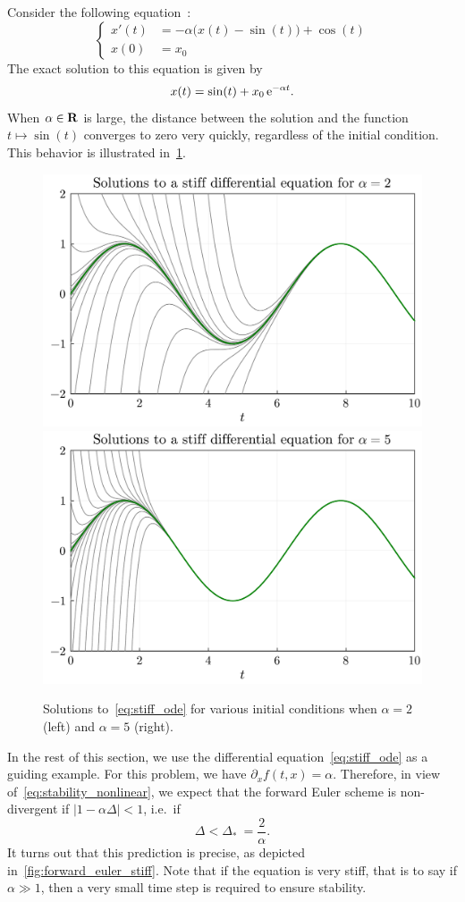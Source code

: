\begin{example}
    \label{example:stiff_ode}
    Consider the following equation~\cite[Chapter 4]{Legat}:
    \begin{equation}
        \label{eq:stiff_ode}
        \left\{
        \begin{aligned}
            x'(t) &= - \alpha \bigl(x(t) - \sin(t) \bigr) + \cos(t) \\
            x(0) &= x_0
        \end{aligned}
        \right.
    \end{equation}
    The exact solution to this equation is given by
    \[
        x(t) = \sin(t) + x_0 \, \mathrm e^{-\alpha t}.
    \]
    When $\alpha \in \mathbf R$ is large,
    the distance between the solution and the function $t \mapsto \sin(t)$ converges to zero very quickly,
    regardless of the initial condition.
    This behavior is illustrated in~\cref{fig:stiff_ode}.
\end{example}
\begin{figure}[ht]
    \centering
    \includegraphics[width=0.49\linewidth]{figures/ode_stiff_2.pdf}
    \includegraphics[width=0.49\linewidth]{figures/ode_stiff_5.pdf}
    \caption{Solutions to~\eqref{eq:stiff_ode} for various initial conditions when $\alpha = 2$ (left) and $\alpha = 5$ (right).}%
    \label{fig:stiff_ode}
\end{figure}

In the rest of this section,
we use the differential equation~\eqref{eq:stiff_ode} as a guiding example.
For this problem, we have $\partial_x f(t, x) = \alpha$.
Therefore, in view of~\eqref{eq:stability_nonlinear},
we expect that the forward Euler scheme is non-divergent if $|1 - \alpha \Delta| < 1$,
i.e.\ if
\[
    \Delta < \Delta_* ~= \frac{2}{\alpha}.
\]
It turns out that this prediction is precise,
as depicted in~\cref{fig:forward_euler_stiff}.
Note that if the equation is very stiff,
that is to say if $\alpha \gg 1$,
then a very small time step is required to ensure stability.

